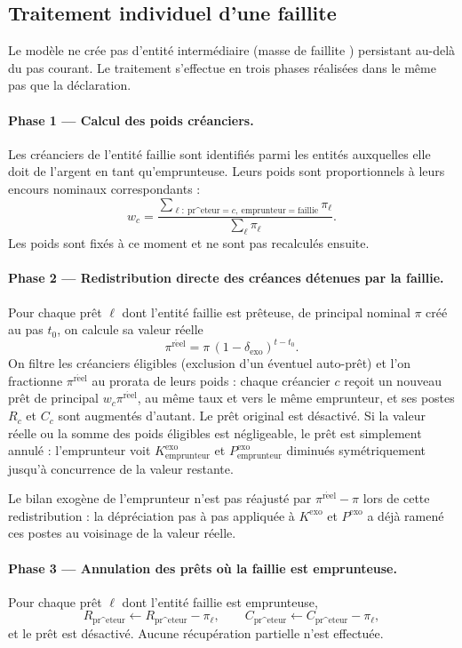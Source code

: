 \documentclass[11pt,a4paper]{article}
\begin{document}
\subsection{Traitement individuel d'une faillite}

Le modèle ne crée pas d'entité intermédiaire (\og masse de faillite \fg{}) persistant au-delà du pas courant. Le traitement s'effectue en trois phases réalisées dans le même pas que la déclaration.

\paragraph{Phase 1 — Calcul des poids créanciers.} Les créanciers de l'entité faillie sont identifiés parmi les entités auxquelles elle doit de l'argent en tant qu'emprunteuse. Leurs poids sont proportionnels à leurs encours nominaux correspondants :
\[
w_c = \frac{\sum_{\ell:\ \mathrm{pr\^eteur}=c,\ \mathrm{emprunteur}=\mathrm{faillie}} \pi_\ell}{\sum_\ell \pi_\ell}.
\]
Les poids sont fixés à ce moment et ne sont pas recalculés ensuite.

\paragraph{Phase 2 — Redistribution directe des créances détenues par la faillie.} Pour chaque prêt \(\ell\) dont l'entité faillie est prêteuse, de principal nominal \(\pi\) créé au pas \(t_0\), on calcule sa valeur réelle
\[
\pi^{\mathrm{r\acute eel}} = \pi\,(1-\delta_{\mathrm{exo}})^{t-t_0}.
\]
On filtre les créanciers éligibles (exclusion d'un éventuel auto-prêt) et l'on fractionne \(\pi^{\mathrm{r\acute eel}}\) au prorata de leurs poids : chaque créancier \(c\) reçoit un nouveau prêt de principal \(w_c \pi^{\mathrm{r\acute eel}}\), au même taux et vers le même emprunteur, et ses postes \(R_c\) et \(C_c\) sont augmentés d'autant. Le prêt original est désactivé. Si la valeur réelle ou la somme des poids éligibles est négligeable, le prêt est simplement annulé : l'emprunteur voit \(K_{\mathrm{emprunteur}}^{\mathrm{exo}}\) et \(P_{\mathrm{emprunteur}}^{\mathrm{exo}}\) diminués symétriquement jusqu'à concurrence de la valeur restante.

Le bilan exogène de l'emprunteur n'est pas réajusté par \(\pi^{\mathrm{r\acute eel}}-\pi\) lors de cette redistribution : la dépréciation pas à pas appliquée à \(K^{\mathrm{exo}}\) et \(P^{\mathrm{exo}}\) a déjà ramené ces postes au voisinage de la valeur réelle.

\paragraph{Phase 3 — Annulation des prêts où la faillie est emprunteuse.} Pour chaque prêt \(\ell\) dont l'entité faillie est emprunteuse,
\[
R_{\mathrm{pr\^eteur}}\leftarrow R_{\mathrm{pr\^eteur}}-\pi_\ell,\qquad
C_{\mathrm{pr\^eteur}}\leftarrow C_{\mathrm{pr\^eteur}}-\pi_\ell,
\]
et le prêt est désactivé. Aucune récupération partielle n'est effectuée.
\end{document}
